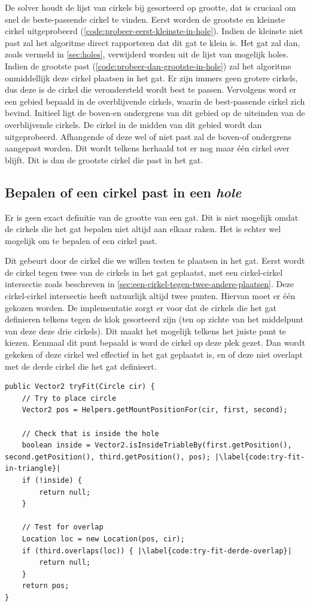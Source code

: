 \documentclass[12pt,a4paper,oneside]{book}
\begin{document}
De solver houdt de lijst van cirkels bij gesorteerd op grootte, dat is cruciaal om snel de beste-passende cirkel te vinden.
Eerst worden de grootste en kleinste cirkel uitgeprobeerd (\autoref{code:probeer-eerst-kleinste-in-hole}).
Indien de kleinste niet past zal het algoritme direct rapporteren dat dit gat te klein is.
Het gat zal dan, zoals vermeld in \autoref{sec:holes}, verwijderd worden uit de lijst van mogelijk holes.
Indien de grootste past (\autoref{code:probeer-dan-grootste-in-hole}) zal het algoritme onmiddellijk deze cirkel plaatsen in het gat.
Er zijn immers geen grotere cirkels, dus deze is de cirkel die verondersteld wordt best te passen.
Vervolgens word er een gebied bepaald in de overblijvende cirkels, waarin de best-passende cirkel zich bevind.
Initieel ligt de boven-en ondergrens van dit gebied op de uiteinden van de overblijvende cirkels.
De cirkel in de midden van dit gebied wordt dan uitgeprobeerd.
Afhangende of deze wel of niet past zal de boven-of ondergrens aangepast worden.
Dit wordt telkens herhaald tot er nog maar één cirkel over blijft.
Dit is dan de grootste cirkel die past in het gat.

\subsection{Bepalen of een cirkel past in een \textit{hole}} \label{subsec:bepalen-of-een-cirkel-past-in-hole}

Er is geen exact definitie van de grootte van een gat.
Dit is niet mogelijk omdat de cirkels die het gat bepalen niet altijd aan elkaar raken.
Het is echter wel mogelijk om te bepalen of een cirkel past.

Dit gebeurt door de cirkel die we willen testen te plaatsen in het gat.
Eerst wordt de cirkel tegen twee van de cirkels in het gat geplaatst, met een cirkel-cirkel intersectie zoals beschreven in \autoref{sec:een-cirkel-tegen-twee-andere-plaatsen}.
Deze cirkel-cirkel intersectie heeft natuurlijk altijd twee punten.
Hiervan moet er één gekozen worden.
De implementatie zorgt er voor dat de cirkels die het gat definieren telkens tegen de klok gesorteerd zijn (ten op zichte van het middelpunt van deze deze drie cirkels).
Dit maakt het mogelijk telkens het juiste punt te kiezen.
Eenmaal dit punt bepaald is word de cirkel op deze plek gezet.
Dan wordt gekeken of deze cirkel wel effectief in het gat geplaatst is, en of deze niet overlapt met de derde cirkel die het gat definieert.

\begin{lstlisting}
public Vector2 tryFit(Circle cir) {
	// Try to place circle
	Vector2 pos = Helpers.getMountPositionFor(cir, first, second);

	// Check that is inside the hole
	boolean inside = Vector2.isInsideTriableBy(first.getPosition(), second.getPosition(), third.getPosition(), pos); |\label{code:try-fit-in-triangle}|
	if (!inside) {
		return null;
	}

	// Test for overlap
	Location loc = new Location(pos, cir);
	if (third.overlaps(loc)) { |\label{code:try-fit-derde-overlap}|
		return null;
	}
	return pos;
}
\end{lstlisting}
\end{document}
